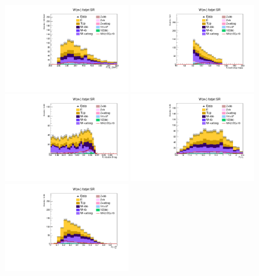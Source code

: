 \begin{figure}[tbp]
  \begin{center}
    \includegraphics[width=0.48\textwidth]{figures/wlnhbb2016/boosted/WenWHFJSR_fj1Pt.pdf}
    \includegraphics[width=0.48\textwidth]{figures/wlnhbb2016/boosted/WenWHFJSR_fj1MSD_corr.pdf}
    \includegraphics[width=0.48\textwidth]{figures/wlnhbb2016/boosted/WenWHFJSR_fj1DoubleCSV.pdf}
    \includegraphics[width=0.48\textwidth]{figures/wlnhbb2016/boosted/WenWHFJSR_fj1Eta.pdf}
    \includegraphics[width=0.48\textwidth]{figures/wlnhbb2016/boosted/WenWHFJSR_fj1Tau21SD.pdf}

\end{center}
\end{figure}
